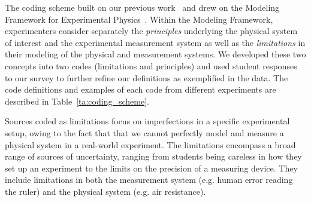 \documentclass[english,aps,prstper,reprint,showpacs,longbibliography,superscriptaddress,nofootinbib]{revtex4-2}
\begin{document}

The coding scheme built on our previous work~\cite{Stein2019,Stump2020} and drew on the Modeling Framework for Experimental Physics~\cite{Zwickl2015,DounasFrazer2018}. Within the Modeling Framework, experimenters consider separately the \emph{principles} underlying the physical system of interest and the experimental measurement system as well as the \emph{limitations} in their modeling of the physical and measurement systems. We developed these two concepts into two codes (limitations and principles) and used student responses to our survey to further refine our definitions as exemplified in the data. The code definitions and examples of each code from different experiments are described in Table~\ref{ta:coding_scheme}.

Sources coded as limitations focus on imperfections in a specific experimental setup, owing to the fact that that we cannot perfectly model and measure a physical system in a real-world experiment. The limitations encompass a broad range of sources of uncertainty, ranging from students being careless in how they set up an experiment to the limits on the precision of a measuring device. They include limitations in both the measurement system (e.g. human error reading the ruler) and the physical system (e.g. air resistance).
\end{document}
